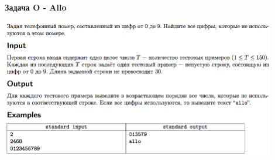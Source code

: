 \documentclass[a4paper,12pt]{article}
\begin{document}
\newpage
\textbf{{\large Задача O - Allo}} \\
\begin{center}
\includegraphics[width=0.9\textwidth]{OC_Europe/OC_Europe_N.png}\\ [1cm]
\end{center}
\newpage
\end{document}
